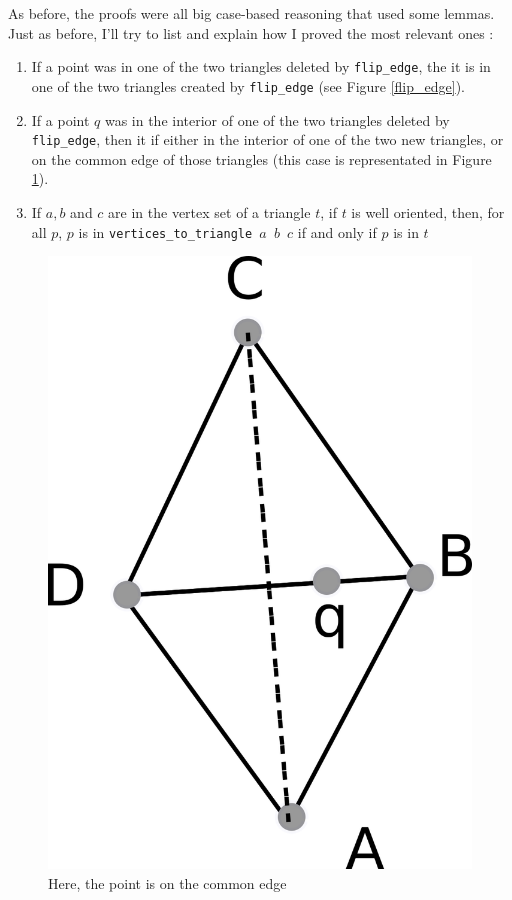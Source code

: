 \documentclass[a4paper,10pt]{article}
\begin{document}
As before, the proofs were all big case-based reasoning that used some lemmas. Just as before, I'll try to list and explain how I proved the most relevant ones :
\begin{enumerate}
\item If a point was in one of the two triangles deleted by {\tt flip\_edge}, the it is in one of the two triangles created by {\tt flip\_edge} (see Figure \ref{flip_edge}).
\item If a point $q$ was in the interior of one of the two triangles deleted by {\tt flip\_edge}, then it if either in the interior of one of the two new triangles, or on the common edge of those triangles (this case is representated in Figure \ref{fenci}).
\item If $a,b$ and $c$ are in the vertex set of a triangle $t$, if $t$ is well oriented, then, for all $p$, $p$ is in {\tt vertices\_to\_triangle $a$ $b$ $c$} if and only if $p$ is in $t$
\end{enumerate}

\begin{figure}
  \centering
  \includegraphics[scale=2]{flip_edge_nci}
    \caption{\label{fenci} Here, the point is on the common edge}
\end{figure}
\end{document}
